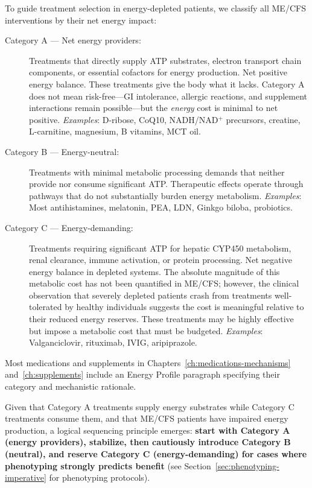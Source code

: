 \begin{observation}
\label{obs:energy-categories}
To guide treatment selection in energy-depleted patients, we classify all ME/CFS interventions by their net energy impact:

\begin{description}
    \item[Category A --- Net energy providers:] Treatments that directly supply ATP substrates, electron transport chain components, or essential cofactors for energy production. Net positive energy balance. These treatments give the body what it lacks. Category A does not mean risk-free---GI intolerance, allergic reactions, and supplement interactions remain possible---but the \textit{energy} cost is minimal to net positive. \textit{Examples}: D-ribose, CoQ10, NADH/NAD$^+$ precursors, creatine, L-carnitine, magnesium, B vitamins, MCT oil.

    \item[Category B --- Energy-neutral:] Treatments with minimal metabolic processing demands that neither provide nor consume significant ATP. Therapeutic effects operate through pathways that do not substantially burden energy metabolism. \textit{Examples}: Most antihistamines, melatonin, PEA, LDN, Ginkgo biloba, probiotics.

    \item[Category C --- Energy-demanding:] Treatments requiring significant ATP for hepatic CYP450 metabolism, renal clearance, immune activation, or protein processing. Net negative energy balance in depleted systems. The absolute magnitude of this metabolic cost has not been quantified in ME/CFS; however, the clinical observation that severely depleted patients crash from treatments well-tolerated by healthy individuals suggests the cost is meaningful relative to their reduced energy reserves. These treatments may be highly effective but impose a metabolic cost that must be budgeted. \textit{Examples}: Valganciclovir, rituximab, IVIG, aripiprazole.
\end{description}

Most medications and supplements in Chapters~\ref{ch:medications-mechanisms} and~\ref{ch:supplements} include an Energy Profile paragraph specifying their category and mechanistic rationale.
\end{observation}

Given that Category A treatments supply energy substrates while Category C treatments consume them, and that ME/CFS patients have impaired energy production, a logical sequencing principle emerges: \textbf{start with Category A (energy providers), stabilize, then cautiously introduce Category B (neutral), and reserve Category C (energy-demanding) for cases where phenotyping strongly predicts benefit} (see Section~\ref{sec:phenotyping-imperative} for phenotyping protocols).

